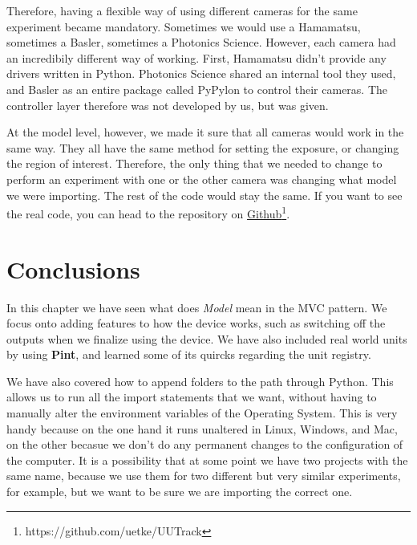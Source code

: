 Therefore, having a flexible way of using different cameras for the same experiment became mandatory. Sometimes we would use a Hamamatsu, sometimes a Basler, sometimes a Photonics Science. However, each camera had an incredibily different way of working. First, Hamamatsu didn't provide any drivers written in Python. Photonics Science shared an internal tool they used, and Basler as an entire package called PyPylon to control their cameras. The controller layer therefore was not developed by us, but was given.

At the model level, however, we made it sure that all cameras would work in the same way. They all have the same method for setting the exposure, or changing the region of interest. Therefore, the only thing that we needed to change to perform an experiment with one or the other camera was changing what model we were importing. The rest of the code would stay the same. If you want to see the real code, you can head to the repository on \href{https://github.com/uetke/UUTrack/tree/master/UUTrack/Model/Cameras}{Github}\footnote{https://github.com/uetke/UUTrack}.

\section{Conclusions}\label{conclusions}
In this chapter we have seen what does \emph{Model} mean in the {MVC} pattern. We focus onto adding features to how the device works, such as switching off the outputs when we finalize using the device. We have also included real world units by using \textbf{Pint}, and learned some of its quircks regarding the unit registry.

We have also covered how to append folders to the path through Python. This allows us to run all the import statements that we want, without having to manually alter the environment variables of the Operating System. This is very handy because on the one hand it runs unaltered in Linux, Windows, and Mac, on the other becasue we don't do any permanent changes to the configuration of the computer. It is a possibility that at some point we have two projects with the same name, because we use them for two different but very similar experiments, for example, but we want to be sure we are importing the correct one.
